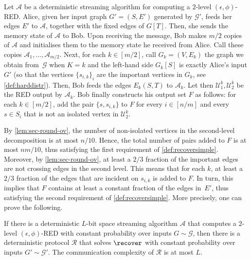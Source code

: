 \begin{reduct*}
	Let $\mathcal{A}$ be a deterministic streaming algorithm for computing a $2$-level $(\epsilon,\phi)$-RED. Alice, given her input graph $G'=(S,E')$ generated by $\mathcal{G}'$, feeds her edges $E'$ to $\mathcal{A}$, together with the fixed edges of $G[T]$. Then, she sends the memory state of $\mathcal{A}$ to Bob. Upon receiving the message, Bob makes $m/2$ copies  of $\mathcal{A}$ and initialises them to the memory state he received from Alice. Call these copies $\mathcal{A}_1, \dots, \mathcal{A}_{m/2}$. Next, for each $k \in [m/2]$, call $G_k = (V,E_k)$ the graph we obtain from~$\mathcal{G}$ when $K=k$ and the left-hand side $G_k[S]$ is exactly Alice's input $G'$ (so that the vertices $\{s_{i,k}\}_i$ are the important vertices in $G_k$, see \cref{def:harddistr}). Then, Bob feeds the edges $E_k(S,T)$ to $\mathcal{A}_k$. Let then $\mathcal{U}^k_1,\mathcal{U}^k_2$ be the RED output by $\mathcal{A}_k$. Bob finally constructs his output set $F$ as follows: for each $k \in [m/2]$, add the pair $\{s,s_{i,k}\}$ to $F$ for every $i \in [n/m]$ and every $s \in S_i$ that is not an isolated vertex in $\mathcal{U}^k_2$.
\end{reduct*}
\noindent
By \cref{lem:sec-round-ov}, the number of non-isolated vertices in the second-level decomposition is at most $n/10$. Hence, the total number of pairs added to $F$ is at most $nm/10$, thus satisfying the first requirement of \cref{def:recoversimple}. Moreover, by \cref{lem:sec-round-ov}, at least a $2/3$ fraction of the important edges are not crossing edges in the second level. This means that for each $k$, at least a $2/3$ fraction of the edges that are incident on $s_{i,k}$ is added to $F$. In turn, this implies that $F$ contains at least a constant fraction of the edges in~$E'$, thus satisfying the second requirement of \cref{def:recoversimple}. More precisely, one can prove the following.

\begin{lemma}
	\label{lem:informalreduction}
	If there is a deterministic $L$-bit space streaming algorithm $\mathcal{A}$ that computes a $2$-level $(\epsilon,\phi)$-RED with constant probability over inputs $G \sim \mathcal{G}$, then there is a deterministic protocol $\mathcal{R}$ that solves $\recover$ with constant probability over inputs $G' \sim \mathcal{G}'$. The communication complexity of $\mathcal{R}$ is at most $L$.
\end{lemma}

